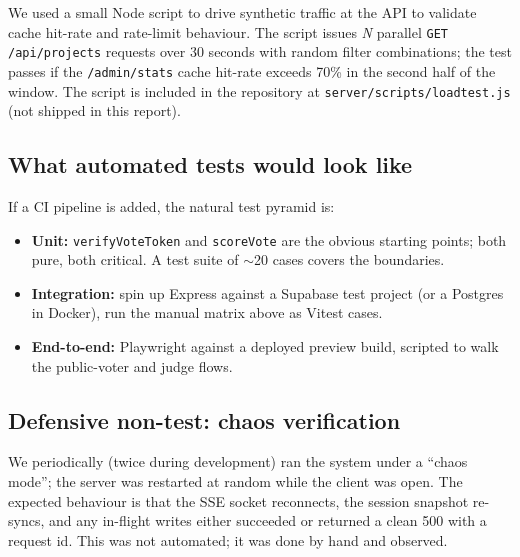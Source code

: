 We used a small Node script to drive synthetic traffic at the API to
validate cache hit-rate and rate-limit behaviour. The script issues
\textit{N} parallel \texttt{GET /api/projects} requests over 30 seconds
with random filter combinations; the test passes if the
\texttt{/admin/stats} cache hit-rate exceeds 70\% in the second half of
the window. The script is included in the repository at
\texttt{server/scripts/loadtest.js} (not shipped in this report).

\subsection{What automated tests would look like}

If a CI pipeline is added, the natural test pyramid is:

\begin{itemize}[leftmargin=*]
  \item \textbf{Unit:} \texttt{verifyVoteToken} and \texttt{scoreVote} are
        the obvious starting points; both pure, both critical. A test
        suite of $\sim$20 cases covers the boundaries.
  \item \textbf{Integration:} spin up Express against a Supabase test
        project (or a Postgres in Docker), run the manual matrix above as
        Vitest cases.
  \item \textbf{End-to-end:} Playwright against a deployed preview build,
        scripted to walk the public-voter and judge flows.
\end{itemize}

\subsection{Defensive non-test: chaos verification}

We periodically (twice during development) ran the system under a
``chaos mode''; the server was restarted at random while the client
was open. The expected behaviour is that the SSE socket reconnects, the
session snapshot re-syncs, and any in-flight writes either succeeded or
returned a clean 500 with a request id. This was not automated; it was
done by hand and observed.
